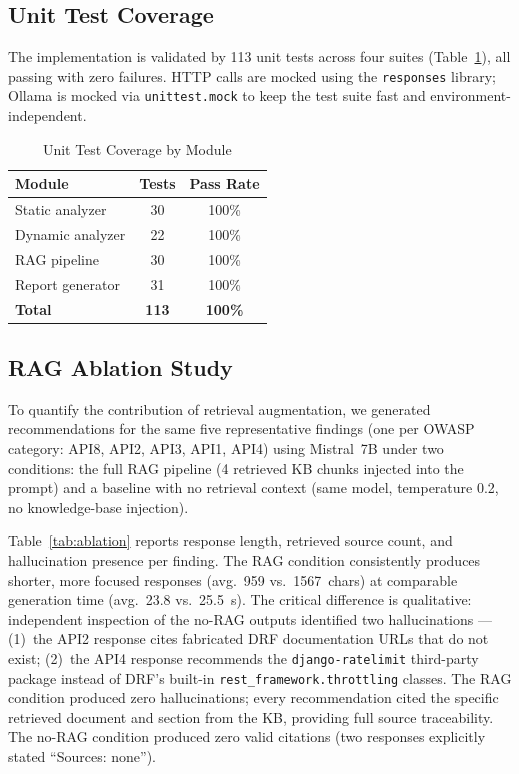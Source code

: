 \documentclass[conference]{IEEEtran}
\begin{document}
\subsection{Unit Test Coverage}

The implementation is validated by 113 unit tests across four suites
(Table~\ref{tab:tests}), all passing with zero failures. HTTP calls are mocked
using the \texttt{responses} library; Ollama is mocked via
\texttt{unittest.mock} to keep the test suite fast and environment-independent.

\begin{table}[htbp]
\caption{Unit Test Coverage by Module}
\label{tab:tests}
\centering
\small
\begin{tabular}{@{}lcc@{}}
\toprule
\textbf{Module} & \textbf{Tests} & \textbf{Pass Rate} \\
\midrule
Static analyzer  & 30 & 100\% \\
Dynamic analyzer & 22 & 100\% \\
RAG pipeline     & 30 & 100\% \\
Report generator & 31 & 100\% \\
\midrule
\textbf{Total}   & \textbf{113} & \textbf{100\%} \\
\bottomrule
\end{tabular}
\end{table}

\subsection{RAG Ablation Study}
\label{sec:ragablation}

To quantify the contribution of retrieval augmentation, we generated
recommendations for the same five representative findings (one per OWASP
category: API8, API2, API3, API1, API4) using Mistral~7B under two
conditions: the full RAG pipeline (4 retrieved KB chunks injected into the
prompt) and a baseline with no retrieval context (same model, temperature
0.2, no knowledge-base injection).

Table~\ref{tab:ablation} reports response length, retrieved source count,
and hallucination presence per finding.
The RAG condition consistently produces shorter, more focused responses
(avg.\ 959 vs.\ 1567~chars) at comparable generation time (avg.\ 23.8 vs.\
25.5~s). The critical difference is qualitative: independent inspection of
the no-RAG outputs identified two hallucinations — (1)~the API2 response
cites fabricated DRF documentation URLs that do not exist; (2)~the API4
response recommends the \texttt{django-ratelimit} third-party package
instead of DRF's built-in \texttt{rest\_framework.throttling} classes.
The RAG condition produced zero hallucinations; every recommendation cited
the specific retrieved document and section from the KB, providing full
source traceability. The no-RAG condition produced zero valid citations
(two responses explicitly stated ``Sources: none'').
\end{document}

